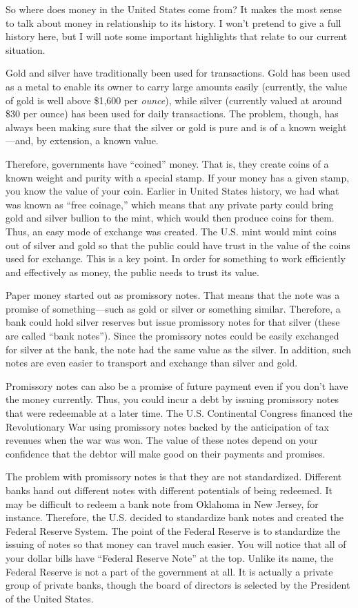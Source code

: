 So where does money in the United States come from?  It makes the most
sense to talk about money in relationship to its history. I won’t
pretend to give a full history here, but I will note some important
highlights that relate to our current situation.  

Gold and silver have traditionally been used for transactions. Gold has
been used as a metal to enable its owner to carry large amounts easily
(currently, the value of gold is well above \$1,600 per
\textit{ounce}), while silver (currently valued at around \$30 per
ounce) has been used for daily transactions. The problem, though, has
always been making sure that the silver or gold is pure and is of a
known weight—and, by extension, a known value. 

Therefore, governments have “coined” money. That is, they create coins
of a known weight and purity with a special stamp. If your money has a
given stamp, you know the value of your coin. Earlier in United States
history, we had what was known as “free coinage,” which means that any
private party could bring gold and silver bullion to the mint, which
would then produce coins for them. Thus, an easy mode of exchange was
created. The U.S. mint would mint coins out of silver and gold so that
the public could have trust in the value of the coins used for
exchange. This is a key point. In order for something to work
efficiently and effectively as money, the public needs to trust its
value.

Paper money started out as promissory notes. That means that the note
was a promise of something—such as gold or silver or something similar.
Therefore, a bank could hold silver reserves but issue promissory notes
for that silver (these are called “bank notes”). Since the promissory
notes could be easily exchanged for silver at the bank, the note had
the same value as the silver.  In addition, such notes are even easier
to transport and exchange than silver and gold.

Promissory notes can also be a promise of future payment even if you
don’t have the money
currently. Thus, you
could incur a debt by issuing promissory notes that were redeemable at
a later time. The U.S. Continental Congress financed the Revolutionary
War using promissory notes backed by the anticipation of tax revenues
when the war was won.  The value of these notes depend on your confidence
that the debtor will make good on their payments and promises.

The problem with promissory notes is that they are not standardized.
Different banks hand out different notes with different potentials of
being redeemed. It may be difficult to redeem a bank note from Oklahoma
in New Jersey, for instance. Therefore, the U.S. decided to standardize
bank notes and created the Federal Reserve System. The point of the
Federal Reserve is to standardize the issuing of notes so that money
can travel much easier. You will notice that all of your dollar bills
have “Federal Reserve Note” at the top.  Unlike its name, the Federal
Reserve is not a part of the government at all.  It is actually a
private group of private banks, though the board of directors is
selected by the President of the United States.

